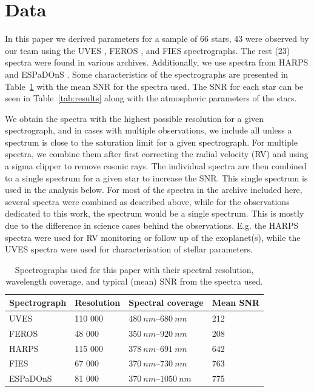 \documentclass{aa}
\begin{document}
\section{Data}
\label{sec:data}
In this paper we derived parameters for a sample of 66 stars,
43 were observed by our team using the UVES \citep{UVES}, FEROS
\citep{FEROS}, and FIES \citep{FIES} spectrographs. The rest (23) spectra were
found in various archives. Additionally, we use spectra from HARPS \citep{HARPS}
and ESPaDOnS \citep{ESPADONS}. Some characteristics of the spectrographs are
presented in Table~\ref{tab:instruments} with the mean SNR for the spectra used.
The SNR for each star can be seen in Table~\ref{tab:results} along with the
atmospheric parameters of the stars.

We obtain the spectra with the highest possible resolution for a given
spectrograph, and in cases with multiple observations, we include all unless a
spectrum is close to the saturation limit for a given spectrograph. For multiple
spectra, we combine them after first correcting the radial velocity (RV) and
using a sigma clipper to remove cosmic rays. The individual spectra are then
combined to a single spectrum for a given star to increase the SNR. This single
spectrum is used in the analysis below. For most of the spectra in the archive
included here, several spectra were combined as described above, while for the
observations dedicated to this work, the spectrum would be a single spectrum.
This is mostly due to the difference in science cases behind the observations.
E.g. the HARPS spectra were used for RV monitoring or follow up of the
exoplanet(s), while the UVES spectra were used for characterisation of stellar
parameters.

\begin{table}[htb!]
    \caption{Spectrographs used for this paper with their spectral resolution,
             wavelength coverage, and typical (mean) SNR from the spectra used.}
    \label{tab:instruments}
    \centering
    \begin{tabular}{llll}
      \hline\hline
      Spectrograph & Resolution & Spectral coverage           &   Mean SNR  \\
      \hline
      UVES         &    110 000 & $\SIrange{480}{680}{nm}$    &   212       \\
      FEROS        &     48 000 & $\SIrange{350}{920}{nm}$    &   208       \\
      HARPS        &    115 000 & $\SIrange{378}{691}{nm}$    &   642       \\
      FIES         &     67 000 & $\SIrange{370}{730}{nm}$    &   763       \\
      ESPaDOnS     &     81 000 & $\SIrange{370}{1050}{nm}$   &   775       \\
      \hline
    \end{tabular}
\end{table}
\end{document}
